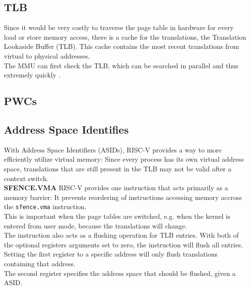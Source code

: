 \subsection{TLB}
Since it would be very costly to traverse the page table in hardware for every load or store memory access,
there is a cache for the translations, the Translation Lookaside Buffer (TLB). This cache contains
the most recent translations from virtual to physical addresses.\\
The MMU can first check the TLB, which can be searched in parallel and thus extremely quickly \cite{drepper2007every}.



\cite{jacobVirtualMemoryContemporary1998}

\subsection{PWCs}
\cite{barrTranslationCachingSkip}
\cite{yaniv2016hash}

\subsection{Address Space Identifies}
With Address Space Identifiers (ASIDs), RISC-V provides a way to more efficiently utilize virtual memory:
Since every process has its own virtual address space, translations that are still present in the
TLB may not be valid after a context switch.\\

\textbf{SFENCE.VMA} RISC-V provides one instruction that acts primarily as a memory barrier:
It prevents reordering of instructions accessing memory accross the \texttt{sfence.vma} instruction.\\
This is important when the page tables are switched, e.g. when the kernel is entered from user mode,
because the translations will change.\\
The instruction also acts as a flushing operation for TLB entries. With both of the optional registers
arguments set to zero, the instruction will flush all entries.\\
Setting the first register to a specific address will only flush translations containing that address.\\
The second register specifies the address space that should be flushed, given a ASID.

